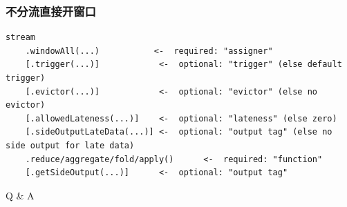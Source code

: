 \documentclass{beamer}
\begin{document}
  \begin{frame}[fragile]
      \frametitle{不分流直接开窗口}
  
\begin{verbatim}
stream
    .windowAll(...)           <-  required: "assigner"
    [.trigger(...)]            <-  optional: "trigger" (else default trigger)
    [.evictor(...)]            <-  optional: "evictor" (else no evictor)
    [.allowedLateness(...)]    <-  optional: "lateness" (else zero)
    [.sideOutputLateData(...)] <-  optional: "output tag" (else no side output for late data)
    .reduce/aggregate/fold/apply()      <-  required: "function"
    [.getSideOutput(...)]      <-  optional: "output tag"
\end{verbatim}
  
  \end{frame}

  \begin{frame}[plain,c]
    
    \begin{center}
    \Huge Q \& A
    \end{center}
    
  \end{frame}
\end{document}
